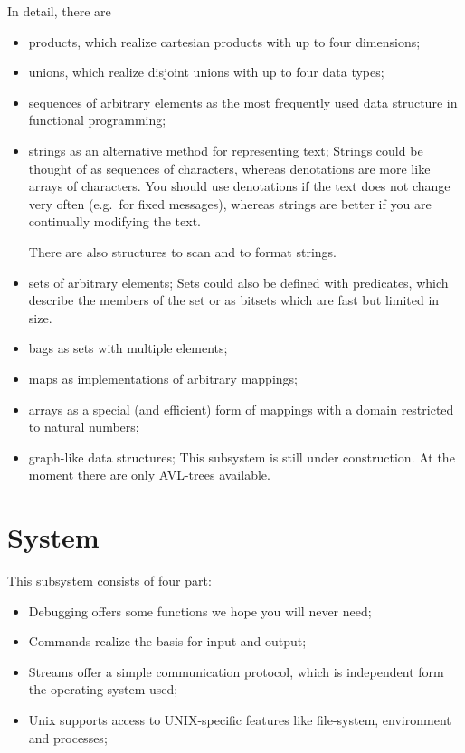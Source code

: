 In detail, there are
\begin{itemize}
\item products, which realize cartesian products with up to four dimensions;
\item unions, which realize disjoint unions with up to four data types;
\item sequences of arbitrary elements as the most frequently used data
  structure in functional programming;
\item strings as an alternative method for representing text; Strings
  could be thought of as sequences of characters, whereas denotations are
  more like arrays of characters. 
  You should use denotations if the text does not change very often
  (e.g.~for fixed messages), whereas strings are better if you are
  continually modifying the text.

  There are also structures to scan and to format strings.
\item sets of arbitrary elements; Sets could also be defined with
  predicates, which describe the members of the set or as bitsets
  which are fast but limited in size.
\item bags as sets with multiple elements;
\item maps as implementations of arbitrary mappings;
\item arrays as a special (and efficient) form of mappings with a
  domain restricted to natural numbers;
\item graph-like data structures; This subsystem is still under
  construction. At the moment there are only AVL-trees available.
\end{itemize}

\section{System}
\novice This subsystem consists of four part:
\begin{itemize}
\item Debugging offers some functions we hope you will never need;
\item Commands realize the basis for input and output;
\item Streams offer a simple communication protocol, which is independent form
  the operating system used;
\item Unix supports access to UNIX-specific features like file-system,
  environment and processes;
\end{itemize}



